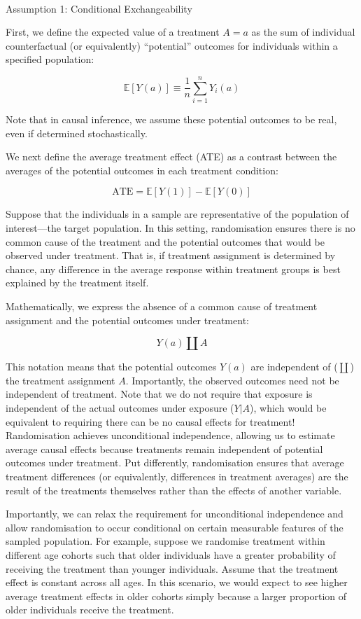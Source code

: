 \documentclass[
  singlecolumn]{article}
\makeatletter
\let\oldparagraph\paragraph
\renewcommand{\paragraph}{
    \@ifstar
      \xxxParagraphStar
      \xxxParagraphNoStar
  }
\newcommand{\xxxParagraphStar}[1]{\oldparagraph*{#1}\mbox{}}
\newcommand{\xxxParagraphNoStar}[1]{\oldparagraph{#1}\mbox{}}
\makeatother
\begin{document}
\paragraph{Assumption 1: Conditional
Exchangeability}\label{assumption-1-conditional-exchangeability}

First, we define the expected value of a treatment \(A=a\) as the sum of
individual counterfactual (or equivalently) ``potential'' outcomes for
individuals within a specified population:

\[
\mathbb{E}[Y(a)] \equiv \frac{1}{n} \sum_{i=1}^n Y_i(a)
\]

Note that in causal inference, we assume these potential outcomes to be
real, even if determined stochastically.

We next define the average treatment effect (ATE) as a contrast between
the averages of the potential outcomes in each treatment condition:

\[
\text{ATE} = \mathbb{E}[Y(1)] - \mathbb{E}[Y(0)]
\]

Suppose that the individuals in a sample are representative of the
population of interest---the target population. In this setting,
randomisation ensures there is no common cause of the treatment and the
potential outcomes that would be observed under treatment. That is, if
treatment assignment is determined by chance, any difference in the
average response within treatment groups is best explained by the
treatment itself.

Mathematically, we express the absence of a common cause of treatment
assignment and the potential outcomes under treatment:

\[
Y(a) \coprod A
\]

This notation means that the potential outcomes \(Y(a)\) are independent
of (\(\coprod\)) the treatment assignment \(A\). Importantly, the
observed outcomes need not be independent of treatment. Note that we do
not require that exposure is independent of the actual outcomes under
exposure (\(Y|A\)), which would be equivalent to requiring there can be
no causal effects for treatment! Randomisation achieves unconditional
independence, allowing us to estimate average causal effects because
treatments remain independent of potential outcomes under treatment. Put
differently, randomisation ensures that average treatment differences
(or equivalently, differences in treatment averages) are the result of
the treatments themselves rather than the effects of another variable.

Importantly, we can relax the requirement for unconditional independence
and allow randomisation to occur conditional on certain measurable
features of the sampled population. For example, suppose we randomise
treatment within different age cohorts such that older individuals have
a greater probability of receiving the treatment than younger
individuals. Assume that the treatment effect is constant across all
ages. In this scenario, we would expect to see higher average treatment
effects in older cohorts simply because a larger proportion of older
individuals receive the treatment.
\end{document}
